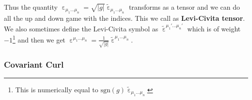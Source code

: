Thus the quantity ${\upepsilon}_{\mu_1\ldots\mu_n} = \sqrt{|g|}\widetilde{\upepsilon}_{\mu_1\ldots\mu_n}$ transforms as a tensor and we can do all the up and down game with the indices. This we call as \textbf{Levi-Civita tensor}. We also sometimes define the Levi-Civita symbol as $\widetilde{\upepsilon}^{\mu_1'\ldots \mu_n'}$ which is of weight $-1$\footnote{This is numerically equal to $\mathrm{sgn}(g) \widetilde{\upepsilon}_{\mu_1\ldots\mu_n}$} and then we get ${\upepsilon}^{\mu_1\ldots\mu_n} = \frac{1}{\sqrt{|g|}}\widetilde{\upepsilon}^{\mu_1\ldots\mu_n}$.
\subsubsection{Covariant Curl}



